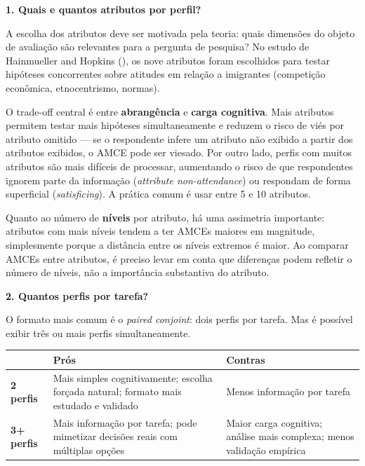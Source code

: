 \documentclass[
]{article}
\begin{document}
\textbf{1. Quais e quantos atributos por perfil?}

A escolha dos atributos deve ser motivada pela teoria: quais dimensões do objeto de avaliação são relevantes para a pergunta de pesquisa? No estudo de Hainmueller and Hopkins (), os nove atributos foram escolhidos para testar hipóteses concorrentes sobre atitudes em relação a imigrantes (competição econômica, etnocentrismo, normas).

O trade-off central é entre \textbf{abrangência} e \textbf{carga cognitiva}. Mais atributos permitem testar mais hipóteses simultaneamente e reduzem o risco de viés por atributo omitido --- se o respondente infere um atributo não exibido a partir dos atributos exibidos, o AMCE pode ser viesado. Por outro lado, perfis com muitos atributos são mais difíceis de processar, aumentando o risco de que respondentes ignorem parte da informação (\emph{attribute non-attendance}) ou respondam de forma superficial (\emph{satisficing}). A prática comum é usar entre 5 e 10 atributos.

Quanto ao número de \textbf{níveis} por atributo, há uma assimetria importante: atributos com mais níveis tendem a ter AMCEs maiores em magnitude, simplesmente porque a distância entre os níveis extremos é maior. Ao comparar AMCEs entre atributos, é preciso levar em conta que diferenças podem refletir o número de níveis, não a importância substantiva do atributo.

\textbf{2. Quantos perfis por tarefa?}

O formato mais comum é o \emph{paired conjoint}: dois perfis por tarefa. Mas é possível exibir três ou mais perfis simultaneamente.

\begin{longtable}[]{@{}
  >{\raggedright\arraybackslash}p{}
  >{\raggedright\arraybackslash}p{}
  >{\raggedright\arraybackslash}p{}@{}}
\toprule\noalign{}
\begin{minipage}[b]{\linewidth}\raggedright
\end{minipage} & \begin{minipage}[b]{\linewidth}\raggedright
Prós
\end{minipage} & \begin{minipage}[b]{\linewidth}\raggedright
Contras
\end{minipage} \\
\midrule\noalign{}
\endhead
\bottomrule\noalign{}
\endlastfoot
\textbf{2 perfis} & Mais simples cognitivamente; escolha forçada natural; formato mais estudado e validado & Menos informação por tarefa \\
\textbf{3+ perfis} & Mais informação por tarefa; pode mimetizar decisões reais com múltiplas opções & Maior carga cognitiva; análise mais complexa; menos validação empírica \\
\end{longtable}
\end{document}
